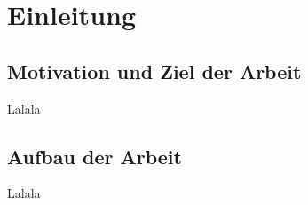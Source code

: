 
\section{Einleitung}


\subsection{Motivation und Ziel der Arbeit}

\par \bigskip
Lalala




\subsection{Aufbau der Arbeit}

\par \bigskip
Lalala

\clearpage